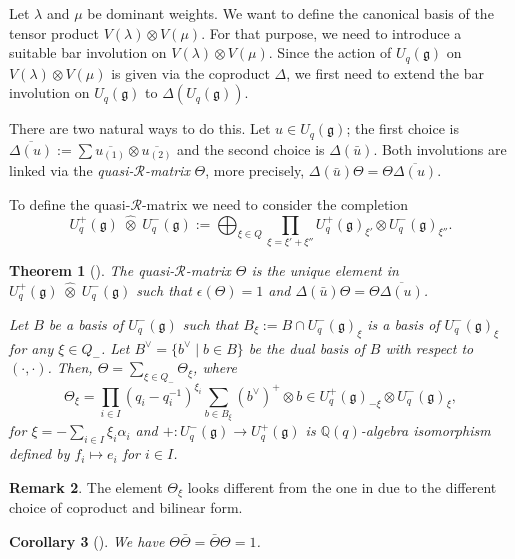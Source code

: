 \documentclass[final]{amsart}
\theoremstyle{plain}
\newtheorem{corollary}{Corollary}[section]
\newtheorem{theorem}[corollary]{Theorem}
\theoremstyle{definition}
\newtheorem{remark}[corollary]{Remark}
\newcommand{\calR}{\mathcal R}
\newcommand{\bbQ}{\mathbb Q}
\newcommand{\frakg}{\mathfrak g}
\begin{document}
Let $\lambda$ and $\mu$ be dominant weights.
We want to define the canonical basis of the tensor product $V(\lambda) \otimes V(\mu)$.
For that purpose, we need to introduce a suitable bar involution on $V(\lambda) \otimes V(\mu)$.
Since the action of $U_q(\frakg)$ on $V(\lambda) \otimes V(\mu)$ is given via the coproduct $\Delta$, we first need to extend the bar involution on $U_q(\frakg)$ to $\Delta(U_q(\frakg))$.

There are two natural ways to do this.
Let $u \in U_q(\frakg)$; the first choice is $\overline{\Delta(u)} := \sum \overline{u_{(1)}} \otimes \overline{u_{(2)}}$ and the second choice is $\Delta(\bar u)$.
Both involutions are linked via the \emph{quasi-$\calR$-matrix} $\Theta$, more precisely, $\Delta(\bar u)\Theta = \Theta\overline{\Delta(u)}$.

To define the quasi-$\calR$-matrix we need to consider the completion
\[
    U_q^+(\frakg) \; \widehat{\otimes} \; U_q^-(\frakg) := \bigoplus_{\xi\in Q} \prod_{\xi=\xi'+\xi''} U_q^+(\frakg)_{\xi'} \otimes U_q^-(\frakg)_{\xi''}.
\]

\begin{theorem}[{\cite[Theorem 4.1.2]{Lusztig:IntroductionToQuantumGroups}}]
    \label{theorem:quasi-r-matrix}
    The quasi-$\calR$-matrix $\Theta$ is the unique element in $U_q^+(\frakg) \;\widehat{\otimes}\; U_q^-(\frakg)$ such that $\epsilon(\Theta) = 1$ and $\Delta(\bar u)\Theta = \Theta\overline{\Delta(u)}$.

    Let $B$ be a basis of $U_q^-(\frakg)$ such that $B_\xi := B \cap U_q^-(\frakg)_\xi$ is a basis of $U_q^-(\frakg)_\xi$ for any $\xi \in Q_-$.
    Let $B^\vee= \{ b^\vee \mid b \in B \}$ be the dual basis of $B$ with respect to $(\cdot, \cdot)$.
    Then, $\Theta = \sum_{\xi\in Q_-} \Theta_\xi$, where
    \[
        \Theta_\xi = \prod_{i\in I} (q_i - q_i^{-1})^{\xi_i} \sum_{b\in B_\xi} (b^\vee)^+ \otimes b \in U_q^+(\frakg)_{-\xi} \otimes U_q^-(\frakg)_\xi,
    \]
    for $\xi = -\sum_{i\in I} \xi_i \alpha_i$ and $+\colon U_q^-(\frakg) \to U_q^+(\frakg)$ is $\bbQ(q)$-algebra isomorphism defined by $f_i \mapsto e_i$ for $i\in I$.
\end{theorem}

\begin{remark}
    The element $\Theta_\xi$ looks different from the one in \cite{Lusztig:IntroductionToQuantumGroups} due to the different choice of coproduct and bilinear form.
\end{remark}

\begin{corollary}[{\cite[Corollary 4.1.3]{Lusztig:IntroductionToQuantumGroups}}]
    We have $\Theta \bar\Theta = \bar\Theta \Theta = 1$.
\end{corollary}
\end{document}
